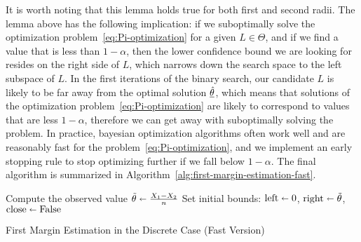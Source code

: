 It is worth noting that this lemma holds true for both first and second radii.
The lemma above has the following implication: if we suboptimally solve the optimization problem~\eqref{eq:Pi-optimization} for a given $L\in\Theta$, and if we find a value that is less than $1-\alpha$, then the lower confidence bound we are looking for resides on the right side of $L$, which narrows down the search space to the left subspace of $L$.
In the first iterations of the binary search, our candidate $L$ is likely to be far away from the optimal solution $\underline{\Hat{\theta}}$, which means that solutions of the optimization problem~\eqref{eq:Pi-optimization} are likely to correspond to values that are less $1-\alpha$, therefore we can get away with suboptimally solving the problem.
In practice, bayesian optimization algorithms often work well and are reasonably fast for the problem~\eqref{eq:Pi-optimization}, and we implement an early stopping rule to stop optimizing further if we fall below $1-\alpha$.
The final algorithm is summarized in Algorithm~\ref{alg:first-margin-estimation-fast}.
\begin{algorithm}[h]
    \DontPrintSemicolon %
    Compute the observed value $\Tilde{\theta}\shortleftarrow\frac{X_1-X_2}{n}$\;
    Set initial bounds: $\text{left}\shortleftarrow0$, $\text{right}\shortleftarrow\Tilde{\theta}$, $\text{close}\shortleftarrow\text{False}$ \;
    \caption{First Margin Estimation in the Discrete Case (Fast Version)}\label{alg:first-margin-estimation-fast}
\end{algorithm}

